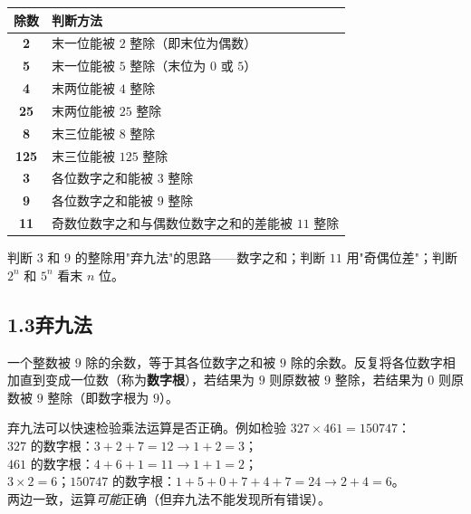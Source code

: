 \documentclass[12pt, a4paper]{ctexart}
\begin{document}
\begin{knowledgebox}[常见整除的尾数判断]
\begin{center}
\renewcommand{\arraystretch}{1.4}
\begin{tabular}{>{\bfseries}c l}
\toprule
除数 & 判断方法 \\
\midrule
2   & 末一位能被 $2$ 整除（即末位为偶数） \\
5   & 末一位能被 $5$ 整除（末位为 $0$ 或 $5$） \\
4   & 末两位能被 $4$ 整除 \\
25  & 末两位能被 $25$ 整除 \\
8   & 末三位能被 $8$ 整除 \\
125 & 末三位能被 $125$ 整除 \\
3   & 各位数字之和能被 $3$ 整除 \\
9   & 各位数字之和能被 $9$ 整除 \\
11  & 奇数位数字之和与偶数位数字之和的差能被 $11$ 整除 \\
\bottomrule
\end{tabular}
\end{center}
\end{knowledgebox}

\begin{tipbox}[记忆技巧]
判断 $3$ 和 $9$ 的整除用"弃九法"的思路——数字之和；判断 $11$ 用"奇偶位差"；判断 $2^n$ 和 $5^n$ 看末 $n$ 位。
\end{tipbox}

\subsection*{1.3\quad 弃九法}

\begin{knowledgebox}[弃九法]
一个整数被 $9$ 除的余数，等于其各位数字之和被 $9$ 除的余数。反复将各位数字相加直到变成一位数（称为\textbf{数字根}），若结果为 $9$ 则原数被 $9$ 整除，若结果为 $0$ 则原数被 $9$ 整除（即数字根为 $9$）。
\end{knowledgebox}

\begin{tipbox}[弃九法的应用]
弃九法可以快速检验乘法运算是否正确。例如检验 $327\times 461=150747$：\\
$327$ 的数字根：$3+2+7=12\to 1+2=3$；\\
$461$ 的数字根：$4+6+1=11\to 1+1=2$；\\
$3\times 2=6$；$150747$ 的数字根：$1+5+0+7+4+7=24\to 2+4=6$。\\
两边一致，运算\emph{可能}正确（但弃九法不能发现所有错误）。
\end{tipbox}
\end{document}
